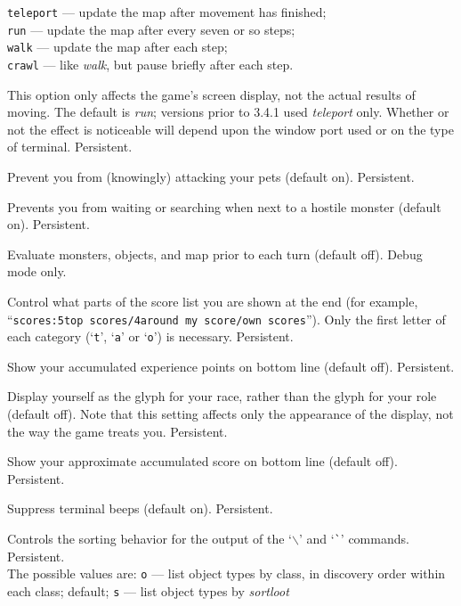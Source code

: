 {\tt teleport} --- update the map after movement has finished;\\
{\tt run} --- update the map after every seven or so steps;\\
{\tt walk} --- update the map after each step;\\
{\tt crawl} --- like {\it walk\/}, but pause briefly after each step.

This option only affects the game's screen display, not the actual
results of moving.  The default is {\it run\/}; versions prior to 3.4.1
used {\it teleport\/} only.  Whether or not the effect is noticeable will
depend upon the window port used or on the type of terminal.  Persistent.
\item[\ib{safe\verb+_+pet}]
Prevent you from (knowingly) attacking your pets (default on).  Persistent.
\item[\ib{safe\verb+_+wait}]
Prevents you from waiting or searching when next to a hostile monster
(default on).  Persistent.
\item[\ib{sanity\verb+_+check}]
Evaluate monsters, objects, and map prior to each turn (default off).
Debug mode only.
\item[\ib{scores}]
Control what parts of the score list you are shown at the end (for example,
``{\tt scores:5top scores/4around my score/own scores}'').  Only the first
letter of each category (`{\tt t}', `{\tt a}' or `{\tt o}') is necessary.
Persistent.
\item[\ib{showexp}]
Show your accumulated experience points on bottom line (default off).
Persistent.
\item[\ib{showrace}]
Display yourself as the glyph for your race, rather than the glyph
for your role (default off).  Note that this setting affects only
the appearance of the display, not the way the game treats you.
Persistent.
\item[\ib{showscore}]
Show your approximate accumulated score on bottom line (default off).
Persistent.
\item[\ib{silent}]
Suppress terminal beeps (default on).  Persistent.
\item[\ib{sortdiscoveries}]
Controls the sorting behavior for the output of the `{\tt $\backslash$}'
and `{\tt \`{}}' commands.
Persistent.
\\
The possible values are:
{\tt o} --- list object types by class, in discovery order within each class;
default;
{\tt s} --- list object types by {\it sortloot\/}
